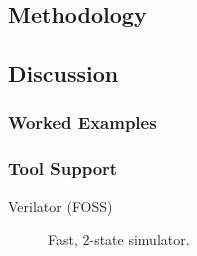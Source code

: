 \documentclass[a4paper]{article}
\begin{document}

\subsection{Methodology} %
\label{sec:SynthesisableProperties_methodology}


\subsection{Discussion} %
\label{sec:SynthesisableProperties_discussion}

\subsubsection{Worked Examples} %
\label{sec:SynthesisableProperties_workedExamples}


\subsubsection{Tool Support} %
\label{sec:SynthesisableProperties_toolSupport}

\begin{description}
\item[Verilator (\gls{FOSS})]
  Fast, 2-state simulator.
\end{description}
\end{document}
